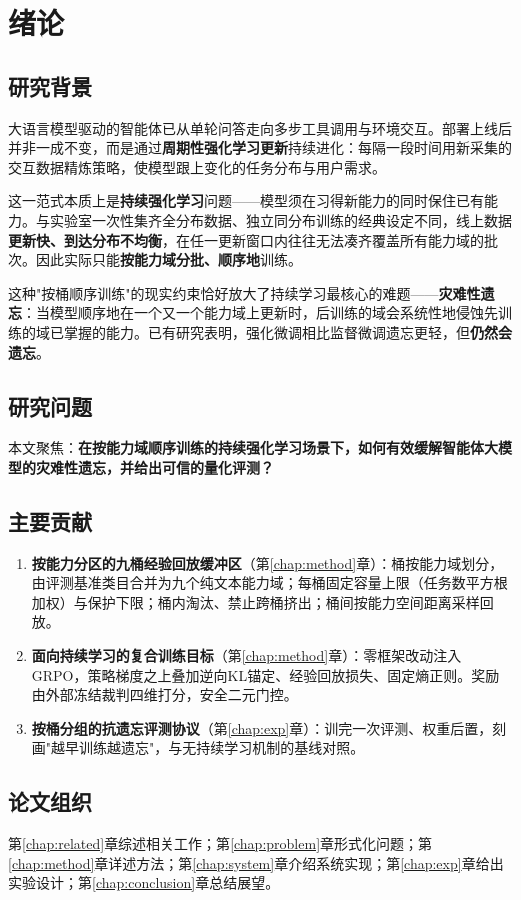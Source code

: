 \chapter{绪论}
\label{chap:intro}

\section{研究背景}

大语言模型驱动的智能体已从单轮问答走向多步工具调用与环境交互。部署上线后并非一成不变，而是通过\textbf{周期性强化学习更新}持续进化：每隔一段时间用新采集的交互数据精炼策略，使模型跟上变化的任务分布与用户需求。

这一范式本质上是\textbf{持续强化学习}问题——模型须在习得新能力的同时保住已有能力。与实验室一次性集齐全分布数据、独立同分布训练的经典设定不同，线上数据\textbf{更新快、到达分布不均衡}，在任一更新窗口内往往无法凑齐覆盖所有能力域的批次。因此实际只能\textbf{按能力域分批、顺序地}训练。

这种"按桶顺序训练"的现实约束恰好放大了持续学习最核心的难题——\textbf{灾难性遗忘}：当模型顺序地在一个又一个能力域上更新时，后训练的域会系统性地侵蚀先训练的域已掌握的能力。已有研究表明，强化微调相比监督微调遗忘更轻，但\textbf{仍然会遗忘}。

\section{研究问题}

本文聚焦：\textbf{在按能力域顺序训练的持续强化学习场景下，如何有效缓解智能体大模型的灾难性遗忘，并给出可信的量化评测？}

\section{主要贡献}

\begin{enumerate}
  \item \textbf{按能力分区的九桶经验回放缓冲区}（第\ref{chap:method}章）：桶按能力域划分，由评测基准类目合并为九个纯文本能力域；每桶固定容量上限（任务数平方根加权）与保护下限；桶内淘汰、禁止跨桶挤出；桶间按能力空间距离采样回放。
  \item \textbf{面向持续学习的复合训练目标}（第\ref{chap:method}章）：零框架改动注入GRPO，策略梯度之上叠加逆向KL锚定、经验回放损失、固定熵正则。奖励由外部冻结裁判四维打分，安全二元门控。
  \item \textbf{按桶分组的抗遗忘评测协议}（第\ref{chap:exp}章）：训完一次评测、权重后置，刻画"越早训练越遗忘"，与无持续学习机制的基线对照。
\end{enumerate}

\section{论文组织}

第\ref{chap:related}章综述相关工作；第\ref{chap:problem}章形式化问题；第\ref{chap:method}章详述方法；第\ref{chap:system}章介绍系统实现；第\ref{chap:exp}章给出实验设计；第\ref{chap:conclusion}章总结展望。
